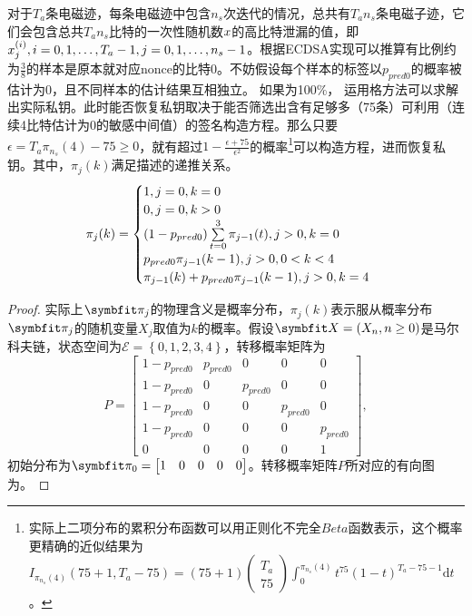 {{	\begin{proposition}\label{prop:highalpha}
		对于$T_a$条电磁迹，每条电磁迹中包含$n_s$次迭代的情况，总共有$T_an_s$条电磁子迹，它们会包含总共$T_an_s$比特的一次性随机数$x$的高比特泄漏的值，即$x^{(i)}_j,i=0,1,\dots,T_a-1,j=0,1,\dots,n_s-1$。根据ECDSA实现可以推算有比例约为$\frac38$的样本是原本就对应nonce的比特0。不妨假设每个样本的标签以$p_{pred0}$的概率被估计为0，且不同样本的估计结果互相独立。
		如果\zyx 为100\%，
		运用格方法可以求解出实际私钥。此时能否恢复私钥取决于能否筛选出含有足够多（75条）可利用（连续4比特估计为0的敏感中间值）的签名构造方程。那么只要$\epsilon=T_a\pi_{n_s}(4)-75\ge0$，就有超过$1-\frac{\epsilon+75}{\epsilon^2}$的概率\footnote{实际上二项分布的累积分布函数可以用正则化不完全$Beta$函数表示，这个概率更精确的近似结果为$I_{\pi_{n_s}(4)}(75+1,T_a-75)=(75+1)\begin{pmatrix}T_a\\75\end{pmatrix}\int_0^{\pi_{n_s}(4)}t^{75}(1-t)^{T_a-75-1}\mathrm dt$。}可以构造方程，进而恢复私钥。其中，$\pi_{j}(k)$满足描述的递推关系。
		\begin{equation}\label{eq:recursion}
		\pi_{j}(k)=\begin{cases}
		1,j=0,k=0\\
		0,j=0,k>0\\
		(1-p_{pred0})\sum\limits_{t=0}^{3}\pi_{j-1}(t),j>0,k=0\\
		p_{pred0}\pi_{j-1}(k-1),j>0,0<k<4\\
		\pi_{j-1}(k)+p_{pred0}\pi_{j-1}(k-1),j>0,k=4
		\end{cases}\\
		\end{equation}
	\end{proposition}
	\begin{proof}
		实际上$\Vector{\pi_j}$的物理含义是概率分布，$\pi_j(k)$表示服从概率分布$\Vector\pi_j$的随机变量$X_j$取值为$k$的概率。假设$\Vector X=(X_n,n\ge0)$是马尔科夫链，状态空间为$\mathcal E=\left\lbrace 0,1,2,3,4\right\rbrace $，转移概率矩阵为$$P=\begin{bmatrix}
		1-p_{pred0}&p_{pred0}&0&0&0\\
		1-p_{pred0}&0&p_{pred0}&0&0\\
		1-p_{pred0}&0&0&p_{pred0}&0\\
		1-p_{pred0}&0&0&0&p_{pred0}\\
		0&0&0&0&1
		\end{bmatrix},$$初始分布为$\Vector\pi_0=\begin{bmatrix}
		1&0&0&0&0
		\end{bmatrix}$。转移概率矩阵$P$所对应的有向图为。
		

\end{proof}}}
